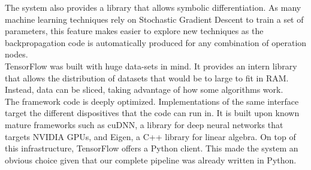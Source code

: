 The system also provides a library that allows symbolic differentiation. As many machine learning techniques rely on Stochastic Gradient Descent to train a set of parameters, this feature makes easier to explore new techniques as the backpropagation code is automatically produced for any combination of operation nodes.\\

TensorFlow was built with huge data-sets in mind. It provides an intern library that allows the distribution of datasets that would be to large to fit in RAM. Instead, data can be sliced, taking advantage of how some algorithms work.\\

The framework code is deeply optimized. Implementations of the same interface target the different dispositives that the code can run in. It is built upon known mature frameworks such as cuDNN, a library for deep neural networks that targets NVIDIA GPUs, and Eigen, a C++ library for linear algebra. On top of this infrastructure, TensorFlow offers a Python client. This made the system an obvious choice given that our complete pipeline was already written in Python.\\













